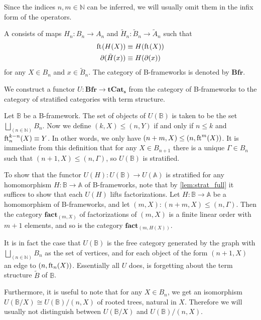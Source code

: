 \begin{rmk}
Since the indices $n,m\in\mathbb{N}$ can be inferred, we will usually omit them
in the infix form of the operators.
\end{rmk}

\begin{defn}
A  consists of maps
$H_n:B_n\to A_n$ and $\tilde{H}_n:\tilde{B}_n\to\tilde{A}_n$ such that
\begin{align*}
\eft(H(X)) & \jdeq H(\eft(X)) \\
\ebd(\tilde{H}(x)) & \jdeq H(\ebd(x))
\end{align*}
for any $X\in B_n$ and $x\in\tilde{B}_n$. The category of B-frameworks is
denoted by $\mathbf{Bfr}$. 
\end{defn}

\begin{defn}
We construct a functor $U:\mathbf{Bfr}\to\mathbf{tCat_s}$ from the category
of B-frameworks to the category of stratified categories with term structure.
\end{defn}

\begin{constr}
Let $\mathbb{B}$ be a B-framework.
The set of objects of $U(\mathbb{B})$ is taken to be the set
$\bigsqcup_{(n\in\mathbb{N})}B_n$. Now we define
$(k,X)\leq (n,Y)$ if and only if $n\leq k$ and $\eft[n]^{k-n}(X)\jdeq Y$.
In other words, we only have $(n+m,X)\leq (n,\eft^m(X))$. It is immediate from
this definition that for any $X\in B_{n+1}$ there is a unique $\Gamma\in
B_n$ such that $(n+1,X)\leq (n,\Gamma)$, so $U(\mathbb{B})$ is stratified.

To show that the functor $U(H):U(\mathbb{B})\to U(\mathbb{A})$ is stratified for
any homomorphism $H:\mathbb{B}\to\mathbb{A}$ of B-frameworks, note that
by \autoref{lem:strat_full} it suffices to show that each $U(H)$ 
lifts factorizations.
Let $H:\mathbb{B}\to\mathbb{A}$ be a homomorphism of B-frameworks, and let
$(m,X):(n+m,X)\leq (n,\Gamma)$. Then the category $\mathbf{fact}_{(m,X)}$ of
factorizations of $(m,X)$ is a finite linear order with
$m+1$ elements, and so is the category $\mathbf{fact}_{(m,H(X))}$. 
\end{constr}

\begin{rmk} 
It is in fact the case that $U(\mathbb{B})$ is the free category generated by the
graph with $\bigsqcup_{(n\in\mathbb{N})}B_n$ as the set of vertices, and
for each object of the form $(n+1,X)$ an edge to $(n,\eft[n](X))$. 
Essentially all $U$ does, is forgetting about the term structure 
$\tilde{B}$ of $\mathbb{B}$.

Furthermore, it is useful to note that for any $X\in B_n$, we get an 
isomorphism $U(\mathbb{B}/X)\cong  U(\mathbb{B})/(n,X)$ of rooted trees,
natural in $X$. Therefore we will usually not distinguish between $U(\mathbb{B}/X)$
and $U(\mathbb{B})/(n,X)$. 
\end{rmk}

